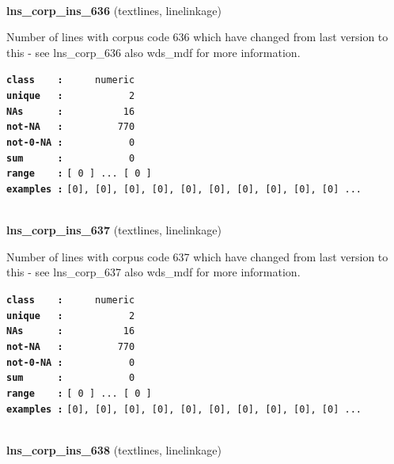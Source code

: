 \documentclass[]{article}
\begin{document}
~

\textbf{lns\_corp\_ins\_636} (textlines, linelinkage)

Number of lines with corpus code 636 which have changed from last
version to this - see lns\_corp\_636 also wds\_mdf for more information.

\textbf{\texttt{class\ \ \ \ :}} \texttt{~~~~~numeric}\\
\textbf{\texttt{unique\ \ \ :}} \texttt{~~~~~~~~~~~2}\\
\textbf{\texttt{NAs\ \ \ \ \ \ :}} \texttt{~~~~~~~~~~16}\\
\textbf{\texttt{not-NA\ \ \ :}} \texttt{~~~~~~~~~770}\\
\textbf{\texttt{not-0-NA\ :}} \texttt{~~~~~~~~~~~0}\\
\textbf{\texttt{sum\ \ \ \ \ \ :}} \texttt{~~~~~~~~~~~0}\\
\textbf{\texttt{range\ \ \ \ :}}
\texttt{{[}\ 0\ {]}\ ...\ {[}\ 0\ {]}}\\
\textbf{\texttt{examples\ :}}
\texttt{{[}0{]},\ {[}0{]},\ {[}0{]},\ {[}0{]},\ {[}0{]},\ {[}0{]},\ {[}0{]},\ {[}0{]},\ {[}0{]},\ {[}0{]}\ ...}\\

~

\textbf{lns\_corp\_ins\_637} (textlines, linelinkage)

Number of lines with corpus code 637 which have changed from last
version to this - see lns\_corp\_637 also wds\_mdf for more information.

\textbf{\texttt{class\ \ \ \ :}} \texttt{~~~~~numeric}\\
\textbf{\texttt{unique\ \ \ :}} \texttt{~~~~~~~~~~~2}\\
\textbf{\texttt{NAs\ \ \ \ \ \ :}} \texttt{~~~~~~~~~~16}\\
\textbf{\texttt{not-NA\ \ \ :}} \texttt{~~~~~~~~~770}\\
\textbf{\texttt{not-0-NA\ :}} \texttt{~~~~~~~~~~~0}\\
\textbf{\texttt{sum\ \ \ \ \ \ :}} \texttt{~~~~~~~~~~~0}\\
\textbf{\texttt{range\ \ \ \ :}}
\texttt{{[}\ 0\ {]}\ ...\ {[}\ 0\ {]}}\\
\textbf{\texttt{examples\ :}}
\texttt{{[}0{]},\ {[}0{]},\ {[}0{]},\ {[}0{]},\ {[}0{]},\ {[}0{]},\ {[}0{]},\ {[}0{]},\ {[}0{]},\ {[}0{]}\ ...}\\

~

\textbf{lns\_corp\_ins\_638} (textlines, linelinkage)
\end{document}
